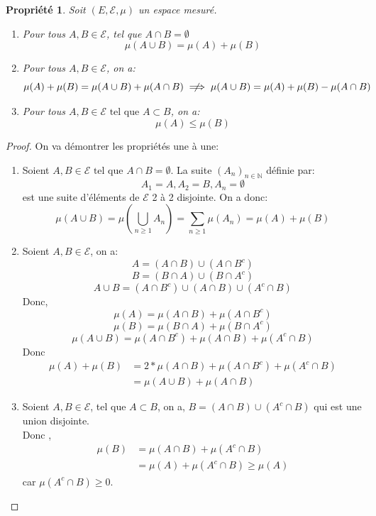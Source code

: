 \documentclass{article}[11pt]
\newtheorem{property}[theorem]{Propriété}
\theoremstyle{definition}
\begin{document}
\begin{property}
  Soit $(E,\mathcal{E},\mu)$ un espace mesuré.
  \begin{enumerate}
    \item Pour tous $A,B \in \mathcal{E}$, tel que $A \cap B = \emptyset$
      $$\mu (A \cup B) = \mu(A) + \mu(B)$$
    \item Pour tous $A,B \in \mathcal{E}$, on a:
      $$\mu(A) + \mu(B) = \mu(A\cup B) + \mu (A \cap B )\centernot \implies \mu(A\cup B) = \mu(A) + \mu(B) - \mu(A\cap B)$$
    \item Pour tous $A,B \in \mathcal{E} \text{ tel que } A \subset B$, on a:
      $$\mu(A) \leq \mu(B)$$
  \end{enumerate}
\end{property}
\begin{proof}
  On va démontrer les propriétés une à une:
  \begin{enumerate}
    \item Soient $A,B \in \mathcal{E} \text{ tel que } A \cap B = \emptyset$. La suite $(A_n)_{n \in \mathbb{N}}$ définie par: 
      $$ A_1 = A, A_2 = B, A_n = \emptyset$$
      est une suite d'éléments de $\mathcal{E}$ 2 à 2 disjointe. On a donc:
      $$\mu(A \cup B) = \mu(\bigcup_{n \geq 1}A_n) = \sum_{ n \geq 1}\mu(A_n) = \mu(A) + \mu(B)$$
    \item Soient $A,B \in \mathcal{E}$, on a:
      \[ A = (A \cap B) \cup (A \cap B^c) \tag{réunion de partie disjointe de E}\]
      \[ B = (B \cap A) \cup (B \cap A^c) \tag{réunion de partie disjointe de E}\]
      \[ A \cup B = (A \cap B^c )\cup(A \cap B)\cup (A^c \cap B)\]
      Donc,
      \[ \mu(A) = \mu(A\cap B) + \mu(A \cap B^c )\]
      \[ \mu(B) = \mu(B\cap A) + \mu(B \cap A^c )\]
      \[ \mu(A \cup B) = \mu(A\cap B^c) + \mu(A \cap B ) + \mu(A^c \cap B)\]
      Donc
      \begin{equation}
        \begin{split}
          \mu(A) + \mu(B) &= 2 * \mu(A \cap B) + \mu(A \cap B^c) + \mu(A^c \cap B) \\ 
                          &= \mu(A \cup B) + \mu(A \cap B)
        \end{split}
      \end{equation}
    \item Soient $A,B \in \mathcal{E}$, tel que $ A \subset B$, on a, $B = (A \cap B) \cup (A^c \cap B)$ qui est une union disjointe.\\ 
      Donc ,
      \begin{equation}
        \begin{split}
          \mu(B) &= \mu( A \cap B) + \mu( A^c \cap B)\\ 
                 &= \mu(A) + \mu(A^c \cap B) \geq \mu(A) 
        \end{split}
      \end{equation}
      car $ \mu( A^c \cap B) \geq 0$.
  \end{enumerate}
\end{proof}
\end{document}
